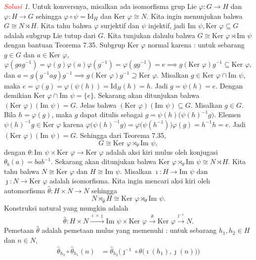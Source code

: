 \documentclass[11pt]{article}
\theoremstyle{definition}
\theoremstyle{remark}
\newtheorem*{solution}{\textcolor{red}{Solusi}}
\newcommand{\image}{\text{Im }}             %
\newcommand{\kernel}{\text{Ker }}           %
\newcommand{\Id}{\text{Id}}                 %
\begin{document}
\begin{solution}
Untuk konversnya, misalkan ada isomorfisma grup Lie $\varphi : G \to H$ dan $\varphi : H \to G$ sehingga $\varphi \circ \psi = \Id_H$ dan $\kernel \varphi \cong N$. Kita ingin menunjukan bahwa $G \cong N \rtimes H$. Kita tahu bahwa $\varphi$ surjektif dan $\psi$ injektif, jadi $\image \psi,\kernel \varphi \subseteq G$ adalah subgrup Lie tutup dari $G$. Kita tunjukan dahulu bahwa $G \cong \kernel \varphi \rtimes \image \psi$ dengan bantuan Teorema 7.35. Subgrup $\kernel \varphi$ normal karena : untuk sebarang $g \in G$ dan $a \in \kernel \varphi$,
$$
\varphi(gag^{-1}) = \varphi(g)\varphi(a) \varphi(g^{-1}) = \varphi(gg^{-1}) = e \implies g(\kernel \varphi) g^{-1} \subseteq \kernel \varphi,
$$
dan $a = g(g^{-1}ag)g^{-1} \implies g(\kernel \varphi) g^{-1} \supseteq \kernel \varphi$. Misalkan $g \in \kernel \varphi \cap \image \psi$, maka $e = \varphi(g) = \varphi (\psi(h)) = \Id_H(h) = h$. Jadi $g = \psi(h) = e$. Dengan demikian $\kernel \varphi \cap \image \psi = \{e\}$. Sekarang akan ditunjukan bahwa $(\kernel \varphi)(\image \psi) = G$. Jelas bahwa $(\kernel \varphi)(\image \psi) \subseteq G$. Misalkan $g \in G$. Bila $h=\varphi(g)$, maka $g$ dapat ditulis sebagai $g = \psi(h)\big(\psi(h)^{-1}g \big)$. Elemen $\psi(h)^{-1}g \in \kernel \varphi$ karena $\varphi \big( \psi(h)^{-1} g \big) = \varphi \big(\psi(h^{-1})\big) \varphi(g) = h^{-1} h = e$. Jadi $(\kernel \varphi)(\image \psi) = G$. Sehingga dari Teorema 7.35, $$
G \cong \kernel \varphi \rtimes_{\theta} \image \psi,
$$ 
dengan $\theta : \image \psi \times \kernel \varphi \to \kernel \varphi$ adalah aksi kiri mulus oleh konjugasi $\theta_{b}(a) = bab^{-1}$. Sekarang akan ditunjukan bahwa $\kernel \varphi \rtimes_{\theta} \image \psi \cong N \rtimes H$. Kita tahu bahwa $N \cong \kernel \varphi$ dan $H \cong \image \psi$. Misalkan $\imath : H \to \image \psi$ dan $\jmath : N \to \kernel \varphi$ adalah isomorfisma. Kita ingin mencari aksi kiri oleh automorfisma $\hat{\theta} : H \times N \to N$ sehingga 
$$
N \rtimes_{\hat{\theta}} H \cong \kernel \varphi \rtimes_{\theta} \image \psi.
$$
Konstruksi natural yang mungkin adalah
$$
\hat{\theta} : H \times N \xrightarrow{\imath \times \jmath} \image \psi \times \kernel \varphi \xrightarrow{\theta} \kernel \varphi \xrightarrow{\jmath^{-1}} N. 
$$
Pemetaan $\hat{\theta}$ adalah pemetaan mulus yang memenuhi : untuk sebarang $h_1,h_2 \in H$ dan $n \in N$,
\begin{align*}
    \hat{\theta}_{h_2} \circ \hat{\theta}_{h_1} (n) &= \hat{\theta}_{h_2} \Big( \jmath^{-1} \circ \theta\big(\imath(h_1),\jmath(n) \big) \Big) \\

\end{align*}
\end{solution}
\end{document}
